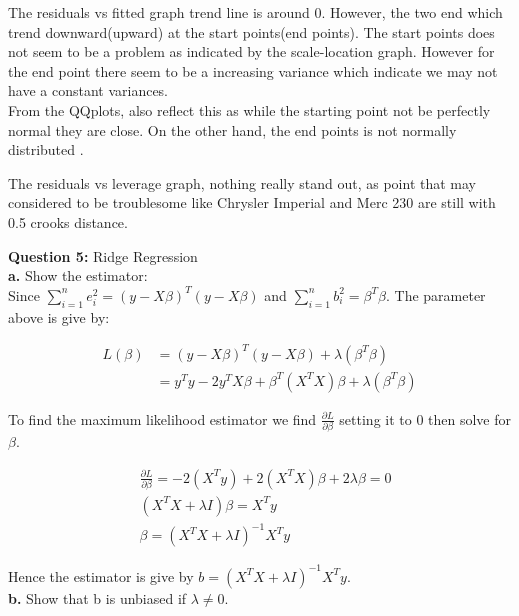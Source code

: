 \documentclass[12 pt, a4paper]{article}
\begin{document}
\vspace{0.3cm}
\noindent The residuals vs fitted graph trend line is around 0. However,  the two end which trend downward(upward) at the start points(end points).  The start points does not seem to be a problem as indicated by the scale-location graph. However for the end point there seem to be a increasing variance which indicate we may not have a constant variances. \\

\noindent From the QQplots,  also reflect this as while the starting point not be perfectly normal they are close.  On the other hand,  the end points is not normally distributed .

\noindent The residuals vs leverage graph,  nothing really stand out, as point that may considered to be troublesome like Chrysler Imperial and Merc 230 are still with 0.5 crooks distance. 

\pagebreak

\noindent \textbf{Question 5:} Ridge Regression \\

\noindent \textbf{a.} Show the estimator: \\

\noindent Since $\sum_{i=1}^{n} e^2_i=(y-X\beta)^T(y-X\beta)$ and $\sum_{i=1}^{n}b^2_i=\beta^T\beta$.  The parameter  above is give by:

\begin{align*}
L(\beta)&=(y-X\beta)^T(y-X\beta)+\lambda(\beta^T\beta)\\
&=y^Ty-2y^TX\beta+\beta^T(X^TX)\beta+\lambda(\beta^T\beta)
\end{align*} 

\noindent To find the maximum likelihood estimator we find $\frac{\partial L}{\partial \beta}$ setting it to 0 then solve for $\beta$.

\begin{align*}
&\frac{\partial L}{\partial \beta} = 	-2(X^T y)+2 (X^T X) \beta+2 \lambda \beta=0 \\
&(X^TX+\lambda I)\beta=X^Ty \\
&\beta = (X^TX+\lambda I)^{-1}X^Ty
\end{align*}

\noindent Hence the estimator is give by $b=(X^TX+\lambda I)^{-1}X^Ty$. \\

\noindent \textbf{b.} Show that b is unbiased if $\lambda \neq 0$. \\
\end{document}
